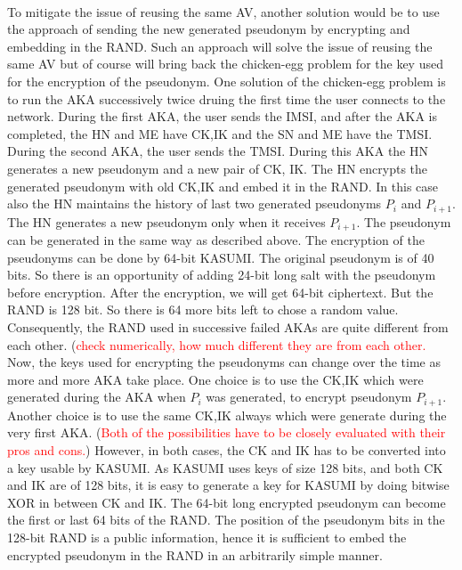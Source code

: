 \documentclass[12pt]{article}
\begin{document}
\paragraph{} To mitigate the issue of reusing the same AV, another solution would be to use the approach of sending the new generated pseudonym by encrypting and embedding in the RAND. Such an approach will solve the issue of reusing the same AV but of course will bring back the chicken-egg problem for the key used for the encryption of the pseudonym. One solution of the chicken-egg problem is to run the AKA successively twice druing the first time the user connects to the network. During the first AKA, the user sends the IMSI, and after the AKA is completed, the HN and ME have CK,IK and the SN and ME have the TMSI. During the second AKA, the user sends the TMSI. During this AKA the HN generates a new pseudonym and a new pair of CK, IK. The HN encrypts the generated pseudonym with old CK,IK and embed it in the RAND. In this case also the HN maintains the history of last two generated pseudonyms $P_{i}$ and $P_{i+1}$. The HN generates a new pseudonym only when it receives $P_{i+1}$. The pseudonym can be generated in the same way as described above. The encryption of the pseudonyms can be done by 64-bit KASUMI. The original pseudonym is of 40 bits. So there is an opportunity of adding 24-bit long salt with the pseudonym before encryption. After the encryption, we will get 64-bit ciphertext. But the RAND is 128 bit. So there is  64 more bits left to chose a random value. Consequently, the RAND used in successive failed AKAs are quite different from each other. (\textcolor{red}{check numerically, how much different they are from each other.} Now, the keys used for encrypting the pseudonyms can change over the time as more and more AKA take place. One choice is to use the CK,IK which were generated during the AKA when $P_{i}$ was generated, to encrypt pseudonym $P_{i+1}$. Another choice is to use the same CK,IK always which were generate during the very first AKA. (\textcolor{red}{Both of the possibilities have to be closely evaluated with their pros and cons.}) However, in both cases, the CK and IK has to be converted into a key usable by KASUMI. As KASUMI uses keys of size 128 bits, and both CK and IK are of 128 bits, it is easy to generate a key for KASUMI by doing bitwise XOR in between CK and IK. The 64-bit long encrypted pseudonym can become the first or last 64 bits of the RAND. The position of the pseudonym bits in the 128-bit RAND is a public information, hence it is sufficient to embed the encrypted pseudonym in the RAND in an arbitrarily simple manner.
\end{document}
